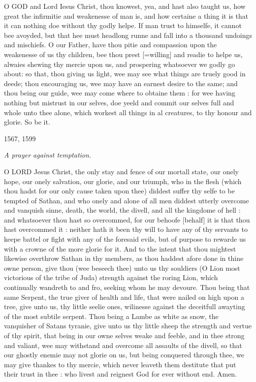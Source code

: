 O
GOD and Lord Iesus Christ, thou knowest, yea, and hast also taught us,
how great the infirmitie and weakenesse of man is, and how certaine a
thing it is that it can nothing doe without thy godly helpe. If man trust
to himselfe, it cannot bee avoyded, but that hee must headlong runne and
fall into a thousand undoings and mischiefs. O our Father, have thou pitie
and compassion upon the weakenesse of us thy children, bee thou prest
[=willing]
and readie to helpe us, alwaies shewing thy mercie upon us, and prospering
whatsoever we godly go about: so that, thou giving us light, wee may see
what things are truely good in deede; thou encouraging us, wee may have
an earnest desire to the same; and thou being our guide, wee may come
where to obtaine them : for wee having nothing but mistrust in our selves,
doe yeeld and commit our selves full and whole unto thee alone, which
workest all things in al creatures, to thy honour and glorie. So be it.

1567,
1599

\emph{A
prayer against temptation.}

O
LORD Jesus Christ, the only stay and fence of our mortall state, our onely
hope, our onely salvation, our glorie, and our triumph, who in the flesh
(which thou hadst for our only cause taken upon thee) diddest suffer thy
selfe to be tempted of Sathan, and who onely and alone of all men diddest
utterly overcome and vanquish sinne, death, the world, the divell, and
all the kingdome of hell : and whatsoever thou hast so overcommed, for
our behoofe [behalf]
it is that thou hast overcommed it : neither hath it been thy will to
have any of thy servants to keepe battel or fight with any of the foresaid
evils, but of purpose to rewarde us with a crowne of the more glorie for
it. And to the intent that thou mightest likewise overthrow Sathan in
thy members, as thou haddest afore done in thine owne person, give thou
(wee beseech thee) unto us thy souldiers (O Lion most victorious of the
tribe of Juda) strength against the roring Lion, which continually wandreth
to and fro, seeking whom he may devoure. Thou being that same Serpent,
the true giver of health and life, that were nailed on high upon a tree,
give unto us, thy little seelie ones, wilinesse against the deceitfull
awayting of the most subtile serpent. Thou being a Lambe as white as snow,
the vanquisher of Satans tyranie, give unto us thy little sheep the strength
and vertue of thy spirit, that being in our owne selves weake and feeble,
and in thee strong and valiant, wee may withstand and overcome all assaults
of the divell, so that our ghostly enemie may not glorie on us, but being
conquered through thee, we may give thankes to thy mercie, which never
leaveth them destitute that put their trust in thee : who livest and reignest
God for ever without end. Amen.

